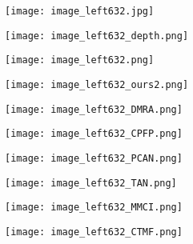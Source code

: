 \documentclass[runningheads]{llncs}
\begin{document}
\begin{figure}[t]
	\begin{subfigure}[t]{1.13cm}
		\centering
		\texttt{[image: image\_left632.jpg]}
	\end{subfigure}
	\begin{subfigure}[t]{1.13cm}
		\centering
		\texttt{[image: image\_left632\_depth.png]}
	\end{subfigure}
	\begin{subfigure}[t]{1.13cm}
		\centering
		\texttt{[image: image\_left632.png]}
	\end{subfigure}
	\begin{subfigure}[t]{1.13cm}
		\centering
		\texttt{[image: image\_left632\_ours2.png]}
	\end{subfigure}
	\begin{subfigure}[t]{1.13cm}
		\centering
		\texttt{[image: image\_left632\_DMRA.png]}
	\end{subfigure}
	\begin{subfigure}[t]{1.13cm}
		\centering
		\texttt{[image: image\_left632\_CPFP.png]}
	\end{subfigure}
	\begin{subfigure}[t]{1.13cm}
		\centering
		\texttt{[image: image\_left632\_PCAN.png]}
	\end{subfigure}
	\begin{subfigure}[t]{1.13cm}
		\centering
		\texttt{[image: image\_left632\_TAN.png]}
	\end{subfigure}
	\begin{subfigure}[t]{1.13cm}
		\centering
		\texttt{[image: image\_left632\_MMCI.png]}
	\end{subfigure}
	\begin{subfigure}[t]{1.13cm}
		\centering
		\texttt{[image: image\_left632\_CTMF.png]}
	\end{subfigure}
	
	\vspace{1pt}
	

\end{figure}
\end{document}
